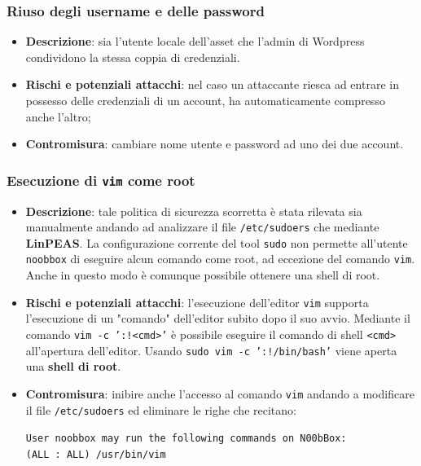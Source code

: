 \documentclass[a4paper, 12pt, oneside]{article}
\begin{document}
\subsubsection{Riuso degli username e delle password}
\begin{itemize}
    \item \textbf{Descrizione}: sia l'utente locale dell'asset che l'admin di Wordpress condividono la stessa coppia di credenziali.
    \item \textbf{Rischi e potenziali attacchi}: nel caso un attaccante riesca ad entrare in possesso delle credenziali di un account, ha automaticamente compresso anche l'altro;
    \item \textbf{Contromisura}: cambiare nome utente e password ad uno dei due account.
\end{itemize}

\subsubsection{Esecuzione di \texttt{vim} come root}
\begin{itemize}
    \item \textbf{Descrizione}: tale politica di sicurezza scorretta è stata rilevata sia manualmente andando ad analizzare il file \texttt{/etc/sudoers} che mediante \textbf{LinPEAS}. La configurazione corrente del tool \texttt{sudo} non permette all'utente \texttt{noobbox} di eseguire alcun comando come root, ad eccezione del comando \texttt{vim}. Anche in questo modo è comunque possibile ottenere una shell di root.
    \item \textbf{Rischi e potenziali attacchi}: l'esecuzione dell'editor \texttt{vim} supporta l'esecuzione di un "comando" dell'editor subito dopo il suo avvio. Mediante il comando \texttt{vim -c ':!<cmd>'} è possibile eseguire il comando di shell \texttt{<cmd>} all'apertura dell'editor. Usando \texttt{sudo vim -c ':!/bin/bash'} viene aperta una \textbf{shell di root}.
    \item \textbf{Contromisura}: inibire anche l'accesso al comando \texttt{vim} andando a modificare il file \texttt{/etc/sudoers} ed eliminare le righe che recitano: \begin{center}
        \texttt{User noobbox may run the following commands on N00bBox:\\
    (ALL : ALL) /usr/bin/vim}
    \end{center}
\end{itemize}
\newpage
\printbibliography[title={Riferimenti bibliografici}]
\end{document}
